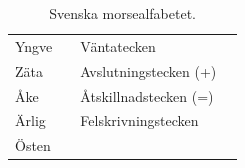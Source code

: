 \begin{table}[H]
\begin{tabular}{llll}
	Yngve   & \MYngve   & Väntatecken           & \MVanta        \\
	Zäta    & \MZata    & Avslutningstecken (+) & \MAvslutning   \\
	Åke     & \MAke     & Åtskillnadstecken (=) & \MAtskillnad   \\
	Ärlig   & \MArlig   & Felskrivningstecken   & \MFelskrivning \\
	Östen   & \MOsten   &                       &                \\
\end{tabular}
\normalsize
\caption{Svenska morsealfabetet.}
\label{tab:morsealfabetet}
\end{table}



